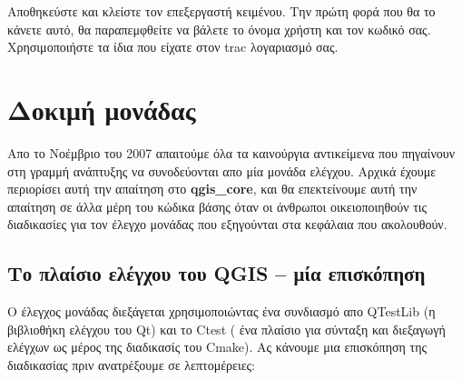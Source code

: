 Αποθηκεύστε και κλείστε τον επεξεργαστή κειμένου. Την πρώτη φορά που θα το κάνετε αυτό, θα παραπεμφθείτε να βάλετε το όνομα χρήστη και τον κωδικό σας. Χρησιμοποιήστε τα ίδια που είχατε στον trac λογαριασμό σας.


\hypertarget{toc47}{}
\section{Δοκιμή μονάδας}
Απο το Νοέμβριο του 2007 απαιτούμε όλα τα καινούργια αντικείμενα που πηγαίνουν στη γραμμή ανάπτυξης να συνοδεύονται απο μία μονάδα ελέγχου. Αρχικά έχουμε περιορίσει αυτή την απαίτηση στο \textbf{qgis\_core}, και θα επεκτείνουμε αυτή την απαίτηση σε άλλα μέρη του κώδικα βάσης όταν οι άνθρωποι οικειοποιηθούν τις διαδικασίες για τον έλεγχο μονάδας που εξηγούνται στα κεφάλαια που ακολουθούν.

\hypertarget{toc48}{}
\subsection{Το πλαίσιο ελέγχου του QGIS – μία επισκόπηση}
Ο έλεγχος μονάδας διεξάγεται χρησιμοποιώντας ένα συνδιασμό απο QTestLib (η βιβλιοθήκη ελέγχου του Qt) και το Ctest ( ένα πλαίσιο για σύνταξη και διεξαγωγή ελέγχων ως μέρος της διαδικασίς του Cmake). Ας κάνουμε μια επισκόπηση της διαδικασίας πριν ανατρέξουμε σε λεπτομέρειες:

